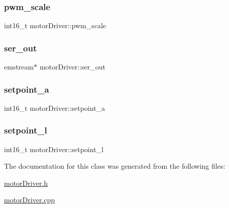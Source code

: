 \subsubsection{\texorpdfstring{pwm\_scale}{pwm\_scale}}
{\footnotesize\ttfamily int16\+\_\+t motor\+Driver\+::pwm\+\_\+scale\hspace{0.3cm}{\ttfamily [protected]}}

\mbox{\label{classmotorDriver_a30b31378644a7e2ae943f953165adcf7}} 
\subsubsection{\texorpdfstring{ser\_out}{ser\_out}}
{\footnotesize\ttfamily emstream$\ast$ motor\+Driver\+::ser\+\_\+out\hspace{0.3cm}{\ttfamily [protected]}}

\mbox{\label{classmotorDriver_adecf277f71f6f214bc6b920d113a05ee}} 
\subsubsection{\texorpdfstring{setpoint\_a}{setpoint\_a}}
{\footnotesize\ttfamily int16\+\_\+t motor\+Driver\+::setpoint\+\_\+a\hspace{0.3cm}{\ttfamily [protected]}}

\mbox{\label{classmotorDriver_ab6f8668c8137d2a8a4eb51e747466465}} 
\subsubsection{\texorpdfstring{setpoint\_l}{setpoint\_l}}
{\footnotesize\ttfamily int16\+\_\+t motor\+Driver\+::setpoint\+\_\+l\hspace{0.3cm}{\ttfamily [protected]}}



The documentation for this class was generated from the following files\+:\begin{DoxyCompactItemize}
\item 
\mbox{\hyperlink{motorDriver_8h}{motor\+Driver.\+h}}\item 
\mbox{\hyperlink{motorDriver_8cpp}{motor\+Driver.\+cpp}}\end{DoxyCompactItemize}
